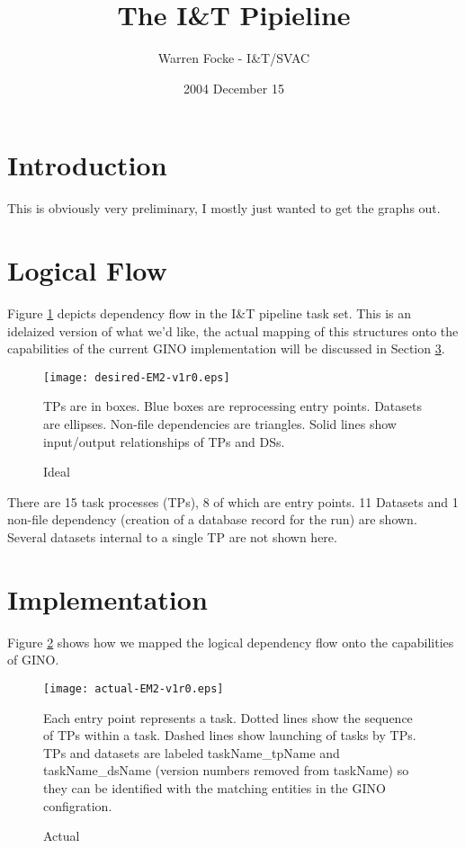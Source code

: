 \documentclass{article}
\begin{document}
\title{The I\&T Pipieline}
\author{Warren Focke - I\&T/SVAC}
\date{2004 December 15}
\maketitle


\section{Introduction}
\label{intro-sec}

This is obviously very preliminary, I mostly just wanted to get the graphs
out.


\section{Logical Flow}
\label{logic-sec}

Figure \ref{desired-fig} depicts dependency flow in the I\&T pipeline task set.
This is an idelaized version of what we'd like, the actual mapping of this
structures onto the capabilities of the current GINO implementation will be
discussed in Section \ref{implement-sec}.

\begin{figure}
\label{desired-fig}
\caption{Ideal}

\texttt{[image: desired-EM2-v1r0.eps]}

{TPs are in boxes. Blue boxes are reprocessing entry points.  Datasets are
ellipses. Non-file dependencies are triangles.  Solid lines show input/output
relationships of TPs and DSs.}

\end{figure}

There are 15 task processes (TPs), 8 of which are entry points.  11 Datasets
and 1 non-file dependency (creation of a database record for the run) are
shown.  Several datasets internal to a single TP are not shown here.




\section{Implementation}
\label{implement-sec}

Figure \ref{actual-fig} shows how we mapped the logical dependency flow onto
the capabilities of GINO.

\begin{figure}
\label{actual-fig}
\caption{Actual}

\texttt{[image: actual-EM2-v1r0.eps]}

{Each entry point represents a task.  Dotted lines show the sequence of TPs
within a task.  Dashed lines show launching of tasks by TPs.  TPs and datasets
are labeled taskName\_tpName and taskName\_dsName (version numbers removed
from taskName) so they can be identified with the matching entities in the
GINO configration.}

\end{figure}
\end{document}
